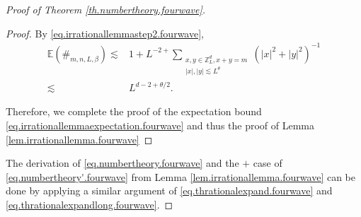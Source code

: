 \begin{proof}[Proof of Theorem \ref{th.numbertheory.fourwave}]
\begin{proof}
By \eqref{eq.irrationallemmastep2.fourwave},
\begin{equation}
\begin{split}
    \mathbb{E}(\#_{m,n,L,\beta})\lesssim & 1+L^{-2+}\sum_{\substack{x,y\in\mathbb{Z}^d_L,x+y=m \\ |x|,|y|\lesssim L^{\theta}}}  (|x|^2+|y|^2)^{-1}    
    \\
    \lesssim& L^{d-2+\theta/2}.
\end{split}
\end{equation}

Therefore, we complete the proof of the expectation bound \eqref{eq.irrationallemmaexpectation.fourwave} and thus the proof of Lemma \ref{lem.irrationallemma.fourwave}
\end{proof}





The derivation of \eqref{eq.numbertheory.fourwave} and the $+$ case of \eqref{eq.numbertheory'.fourwave} from Lemma \ref{lem.irrationallemma.fourwave} can be done by applying a similar argument of \eqref{eq.thrationalexpand.fourwave} and \eqref{eq.thrationalexpandlong.fourwave}.
\end{proof}

